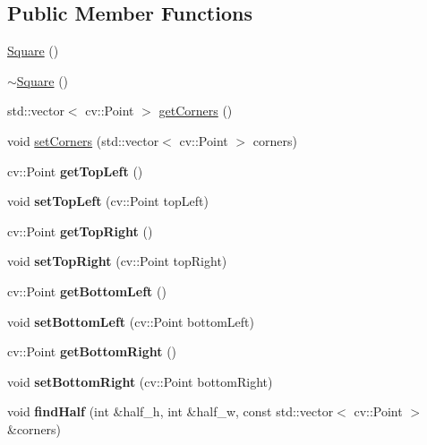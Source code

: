 \subsection*{Public Member Functions}
\begin{DoxyCompactItemize}
\item 
\mbox{\hyperlink{class_square_a3dc7ff9aefc2725172b5d3153973d243}{Square}} ()
\item 
\mbox{\hyperlink{class_square_a90af7ce1060cff7b717ceddb333846b8}{$\sim$\+Square}} ()
\item 
std\+::vector$<$ cv\+::\+Point $>$ \mbox{\hyperlink{class_square_a53b1e1223e97676db711dd75f2daa508}{get\+Corners}} ()
\item 
void \mbox{\hyperlink{class_square_a84c4995b49318b5191a4fe3739e4f081}{set\+Corners}} (std\+::vector$<$ cv\+::\+Point $>$ corners)
\item 
\mbox{\label{class_square_a42b9d166cf37272874e4935e9178b4fe}} 
cv\+::\+Point {\bfseries get\+Top\+Left} ()
\item 
\mbox{\label{class_square_acb761285e20face2022455dcbec94da1}} 
void {\bfseries set\+Top\+Left} (cv\+::\+Point top\+Left)
\item 
\mbox{\label{class_square_a7bbb8c4184f70ea57f3cb1a7e5574fc2}} 
cv\+::\+Point {\bfseries get\+Top\+Right} ()
\item 
\mbox{\label{class_square_aa98e6a5531a41610da56a1289973619f}} 
void {\bfseries set\+Top\+Right} (cv\+::\+Point top\+Right)
\item 
\mbox{\label{class_square_aafe4233643d20d20be71e01c1ebee1f1}} 
cv\+::\+Point {\bfseries get\+Bottom\+Left} ()
\item 
\mbox{\label{class_square_a9ce15c8f5c3972aa82b0abb2d3a02e9c}} 
void {\bfseries set\+Bottom\+Left} (cv\+::\+Point bottom\+Left)
\item 
\mbox{\label{class_square_ac3c23f97b3ae3e5b4a185165d5a13ac2}} 
cv\+::\+Point {\bfseries get\+Bottom\+Right} ()
\item 
\mbox{\label{class_square_a709d566fdf9327d41db0a4a08b105737}} 
void {\bfseries set\+Bottom\+Right} (cv\+::\+Point bottom\+Right)
\item 
\mbox{\label{class_square_a3711587b331ec6980caf1924141b5a9f}} 
void {\bfseries find\+Half} (int \&half\+\_\+h, int \&half\+\_\+w, const std\+::vector$<$ cv\+::\+Point $>$ \&corners)
\end{DoxyCompactItemize}
